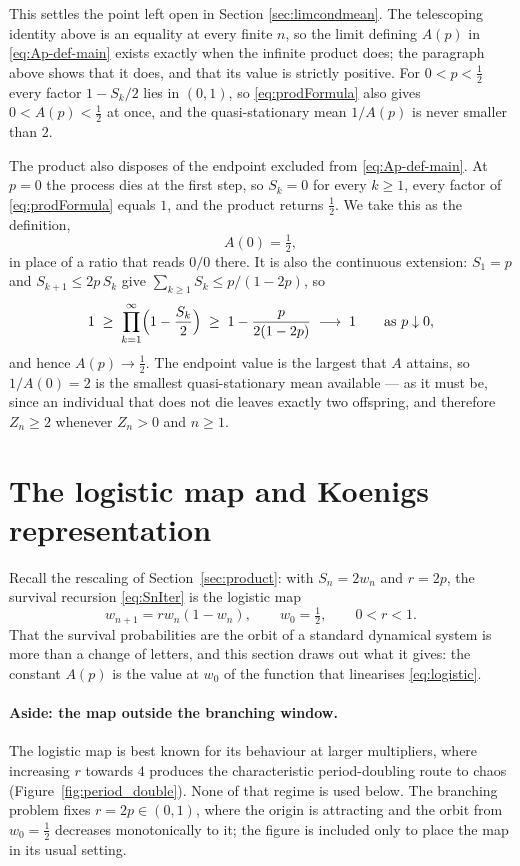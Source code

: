 \documentclass[11pt]{article}
\begin{document}
This settles the point left open in Section \ref{sec:limcondmean}. The telescoping identity above is an equality at every finite $n$, so the limit defining $A(p)$ in \eqref{eq:Ap-def-main} exists exactly when the infinite product does; the paragraph above shows that it does, and that its value is strictly positive. For $0<p<\tfrac12$ every factor $1-S_k/2$ lies in $(0,1)$, so \eqref{eq:prodFormula} also gives $0<A(p)<\tfrac12$ at once, and the quasi-stationary mean $1/A(p)$ is never smaller than $2$.

The product also disposes of the endpoint excluded from \eqref{eq:Ap-def-main}. At $p=0$ the process dies at the first step, so $S_k=0$ for every $k\ge1$, every factor of \eqref{eq:prodFormula} equals $1$, and the product returns $\tfrac12$. We take this as the definition,
\[
A(0)=\tfrac12,
\]
in place of a ratio that reads $0/0$ there. It is also the continuous extension: $S_1=p$ and $S_{k+1}\le 2p\,S_k$ give $\sum_{k\ge1}S_k\le p/(1-2p)$, so
\[
1\;\ge\;\prod_{k=1}^{\infty}\Bigl(1-\frac{S_k}{2}\Bigr)\;\ge\;1-\frac{p}{2(1-2p)}\;\longrightarrow\;1
\qquad\text{as }p\downarrow0,
\]
and hence $A(p)\to\tfrac12$. The endpoint value is the largest that $A$ attains, so $1/A(0)=2$ is the smallest quasi-stationary mean available --- as it must be, since an individual that does not die leaves exactly two offspring, and therefore $Z_n\ge2$ whenever $Z_n>0$ and $n\ge1$.


\section{The logistic map and Koenigs representation}
\label{sec:koenigs}

Recall the rescaling of Section~\ref{sec:product}: with $S_n=2w_n$ and $r=2p$, the
survival recursion \eqref{eq:SnIter} is the logistic map
\begin{equation}
w_{n+1} = r w_n (1 - w_n),
\qquad w_0=\tfrac12,
\qquad 0<r<1 .
\label{eq:logistic}
\end{equation}
That the survival probabilities are the orbit of a standard dynamical system is
more than a change of letters, and this section draws out what it gives: the
constant $A(p)$ is the value at $w_0$ of the function that linearises \eqref{eq:logistic}.

\paragraph{Aside: the map outside the branching window.} The logistic map is best
known for its behaviour at larger multipliers, where increasing $r$ towards $4$
produces the characteristic period-doubling route to chaos (Figure~\ref{fig:period_double}).
None of that regime is used below. The branching problem fixes $r=2p\in(0,1)$,
where the origin is attracting and the orbit from $w_0=\tfrac12$ decreases
monotonically to it; the figure is included only to place the map in its usual
setting.
\end{document}
